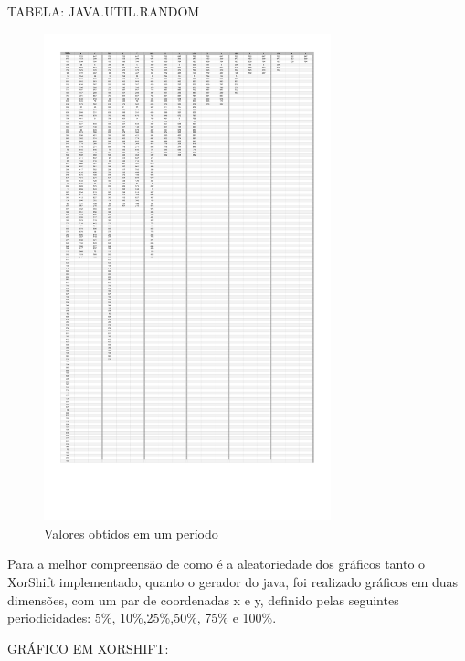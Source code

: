 TABELA: JAVA.UTIL.RANDOM
\begin{figure}[H]
            \centering
                \includegraphics[width=0.74\textwidth]{tabelaRandJava.pdf}
                 \caption{Valores obtidos em um período}
                \label{fig:Desempenho}
        \end{figure}
       
Para a melhor compreensão de como é a aleatoriedade dos gráficos tanto o XorShift implementado, quanto o gerador do java, foi realizado gráficos em duas dimensões, com um par de coordenadas x e y, definido pelas seguintes periodicidades: 5\%, 10\%,25\%,50\%, 75\% e 100\%.

GRÁFICO EM XORSHIFT:

